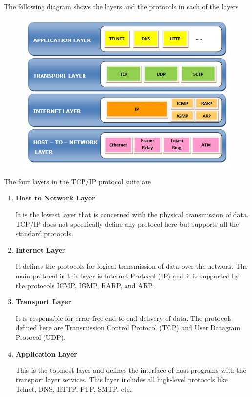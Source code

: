\documentclass[twocolumn, a4paper]{article}
\begin{document}
The following diagram shows the layers and the protocols in each of the layers

\begin{figure}[h]
  \centering
  \includegraphics[width=\columnwidth]{tcpip}
\end{figure}
The four layers in the TCP/IP protocol suite are

\begin{enumerate}
  \item \textbf{Host-to-Network Layer}

    It is the lowest layer that is concerned with the physical transmission of
    data. TCP/IP does not specifically define any protocol here but supports
    all the standard protocols.
  \item \textbf{Internet Layer}

    It defines the protocols for logical transmission of data over the network.
    The main protocol in this layer is Internet Protocol (IP) and it is
    supported by the protocols ICMP, IGMP, RARP, and ARP.
  \item \textbf{Transport Layer}
    
    It is responsible for error-free end-to-end delivery of data. The protocols
    defined here are Transmission Control Protocol (TCP) and User Datagram
    Protocol (UDP).
  \item \textbf{Application Layer}
    
    This is the topmost layer and defines the interface of host programs with
    the transport layer services. This layer includes all high-level protocols 
    like Telnet, DNS, HTTP, FTP, SMTP, etc.
\end{enumerate}
\end{document}
